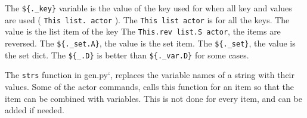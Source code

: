 The \texttt{\$\{.\_key\}} variable is the value of the key used for when
all key and values are used ( \texttt{This\ list.\ actor} ). The
\texttt{This\ list\ actor} is for all the keys. The value is the list
item of the key The \texttt{This.rev\ list.S\ actor}, the items are
reversed. The \texttt{\$\{.\_set.A\}}, the value is the set item. The
\texttt{\$\{.\_set\}}, the value is the set dict. The
\texttt{\$\{\_.D\}} is better than \texttt{\$\{.\_var.D\}} for some
cases.

The \texttt{strs} function in gen.py`, replaces the variable names of a
string with their values. Some of the actor commands, calls this
function for an item so that the item can be combined with variables.
This is not done for every item, and can be added if needed.
